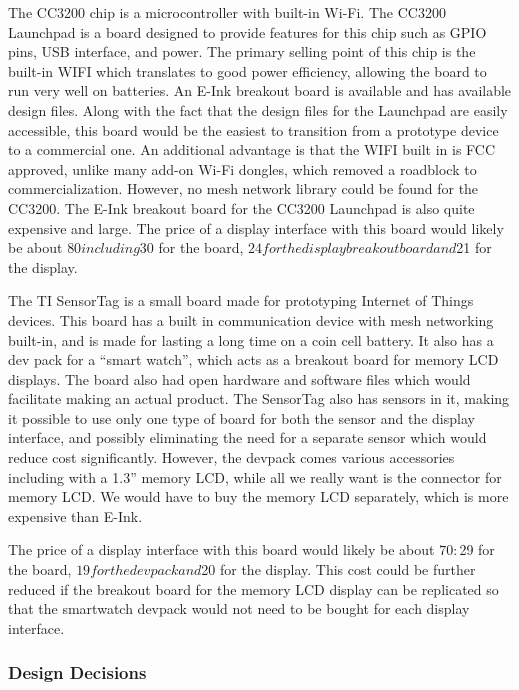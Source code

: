 \documentclass[ppfs.tex]{template/subfiles}
\begin{document}
The CC3200 chip is a microcontroller with built-in Wi-Fi. The CC3200 Launchpad is a board designed to provide features for this chip such as GPIO pins, USB interface, and power.
The primary selling point of this chip is the built-in WIFI which translates to good power efficiency, allowing the board to run very well on batteries. An E-Ink breakout board is available and has available design files. Along with the fact that the design files for the Launchpad are easily accessible, this board would be the easiest to transition from a prototype device to a commercial one. An additional advantage is that the WIFI built in is FCC approved, unlike many add-on Wi-Fi dongles, which removed a roadblock to commercialization. 
However, no mesh network library could be found for the CC3200. The E-Ink breakout board for the CC3200 Launchpad is also quite expensive and large.
The price of a display interface with this board would likely be about $80 including $30 for the board, $24 for the display breakout board and $21 for the display.

The TI SensorTag is a small board made for prototyping Internet of Things devices. 
This board has a built in communication device with mesh networking built-in, and is made for lasting a long time on a coin cell battery. It also has a dev pack for a “smart watch”, which acts as a breakout board for memory LCD displays. The board also had open hardware and software files which would facilitate making an actual product. The SensorTag also has sensors in it, making it possible to use only one type of board for both the sensor and the display interface, and possibly eliminating the need for a separate sensor which would reduce cost significantly.
However, the devpack comes various accessories including with a 1.3” memory LCD, while all we really want is the connector for memory LCD. We would have to buy the memory LCD separately, which is more expensive than E-Ink.

The price of a display interface with this board would likely be about $70: $29 for the board, $19 for the devpack and $20 for the display. This cost could be further reduced if the breakout board for the memory LCD display can be replicated so that the smartwatch devpack would not need to be bought for each display interface.

\subsubsection{Design Decisions}
\end{document}

